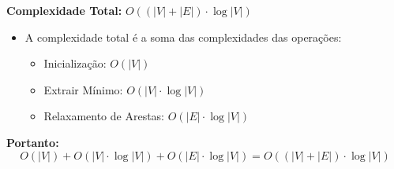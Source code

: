 \documentclass[preview]{standalone}
\begin{document}
\begin{center}
\textbf{Complexidade Total:} $O((|V| + |E|) \cdot \log |V|)$
            \begin{itemize}
                \item A complexidade total é a soma das complexidades das operações:
                    \begin{itemize}
                        \item Inicialização: $O(|V|)$
                        \item Extrair Mínimo: $O(|V| \cdot \log |V|)$
                        \item Relaxamento de Arestas: $O(|E| \cdot \log |V|)$
                    \end{itemize}
            \end{itemize}
                        
            \vspace{1cm}
            
            \textbf{Portanto:}
            \[
            O(|V|) + O(|V| \cdot \log |V|) + O(|E| \cdot \log |V|) = O((|V| + |E|) \cdot \log |V|)
            \]
\end{center}
\end{document}
